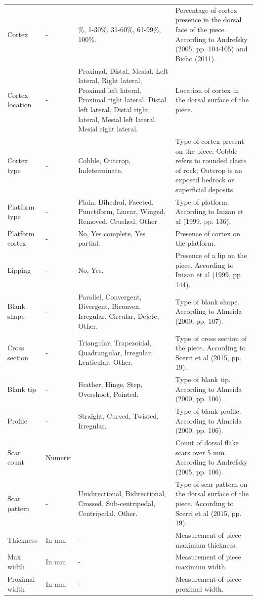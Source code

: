 \documentclass[12pt,twoside]{reedthesis}
\begin{document}
\begin{landscape}
\begin{longtable}[t]{>{\raggedright\arraybackslash}p{2cm}>{\raggedright\arraybackslash}p{3cm}>{\raggedright\arraybackslash}p{6cm}>{\raggedright\arraybackslash}p{9cm}}
Cortex & - & 0\%, 1-30\%, 31-60\%, 61-99\%, 100\%. & Percentage of cortex presence in the dorsal face of the piece. According to Andrefsky (2005, pp. 104-105) and Bicho (2011).\\
Cortex location & - & Proximal, Distal, Mesial, Left lateral, Right lateral, Proximal left lateral, Proximal right lateral, Distal left lateral, Distal right lateral, Mesial left lateral, Mesial right lateral. & Location of cortex in the dorsal surface of the piece.\\
Cortex type & - & Cobble, Outcrop, Indeterminate. & Type of cortex present on the piece. Cobble refers to rounded clasts of rock; Outcrop is an exposed bedrock or superficial deposits.\\
\addlinespace
Platform type & - & Plain, Dihedral, Faceted, Punctiform, Linear, Winged, Removed, Crushed, Other. & Type of platform. According to Inizan et al (1999, pp. 136).\\
Platform cortex & - & No, Yes complete, Yes partial. & Presence of cortex on the platform.\\
Lipping & - & No, Yes. & Presence of a lip on the piece. According to Inizan et al (1999, pp. 144).\\
Blank shape & - & Parallel, Convergent, Divergent, Biconvex, Irregular, Circular, Dejete, Other. & Type of blank shape. According to Almeida (2000, pp. 107).\\
Cross section & - & Triangular, Trapezoidal, Quadrangular, Irregular, Lenticular, Other. & Type of cross section of the piece. According to Scerri et al (2015, pp. 19).\\
\addlinespace
Blank tip & - & Feather, Hinge, Step, Overshoot, Pointed. & Type of blank tip. According to Almeida (2000, pp. 106).\\
Profile & - & Straight, Curved, Twisted, Irregular. & Type of blank profile. According to Almeida (2000, pp. 106).\\
Scar count & Numeric &  & Count of dorsal flake scars over 5 mm. According to Andrefsky (2005, pp. 106).\\
Scar pattern & - & Unidirectional, Bidirectional, Crossed, Sub-centripedal, Centripedal, Other. & Type of scar pattern on the dorsal surface of the piece. According to Scerri et al (2015, pp. 19).\\
Thickness & In mm & - & Measurement of piece maximum thickness.\\
\addlinespace
Max width & In mm & - & Measurement of piece maximum width.\\
Proximal width & In mm & - & Measurement of piece proximal width.\\

\end{longtable}
\end{landscape}
\end{document}

